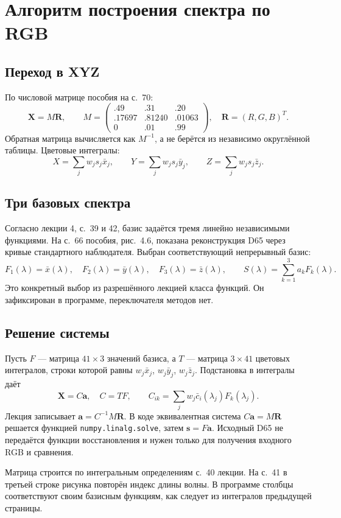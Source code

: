 \documentclass[a4paper,12pt]{article}
\newcommand{\code}[1]{\nolinkurl{#1}}
\begin{document}
\clearpage
\section{Алгоритм построения спектра по RGB}
\subsection{Переход в XYZ}
По числовой матрице пособия на с.~70:
\[
 \boldsymbol X=M\boldsymbol R,\qquad
 M=\begin{pmatrix}
 .49&.31&.20\\ .17697&.81240&.01063\\ 0&.01&.99
 \end{pmatrix},\quad \boldsymbol R=(R,G,B)^T.
\]
Обратная матрица вычисляется как $M^{-1}$, а не берётся из независимо округлённой таблицы. Цветовые интегралы:
\[
 X=\sum_jw_js_j\bar x_j,\qquad Y=\sum_jw_js_j\bar y_j,\qquad
 Z=\sum_jw_js_j\bar z_j.
\]

\subsection{Три базовых спектра}
Согласно лекции 4, с.~39 и 42, базис задаётся тремя линейно независимыми функциями. На с.~66 пособия, рис.~4.6, показана реконструкция D65 через кривые стандартного наблюдателя. Выбран соответствующий непрерывный базис:
\[
 F_1(\lambda)=\bar x(\lambda),\quad F_2(\lambda)=\bar y(\lambda),\quad
 F_3(\lambda)=\bar z(\lambda),\qquad S(\lambda)=\sum_{k=1}^3a_kF_k(\lambda).
\]
Это конкретный выбор из разрешённого лекцией класса функций. Он зафиксирован в программе, переключателя методов нет.

\subsection{Решение системы}
Пусть $F$ --- матрица $41\times3$ значений базиса, а $T$ --- матрица $3\times41$ цветовых интегралов, строки которой равны $w_j\bar x_j$, $w_j\bar y_j$, $w_j\bar z_j$. Подстановка в интегралы даёт
\[
 \boldsymbol X=C\boldsymbol a,\quad C=TF,\qquad
 C_{ik}=\sum_jw_j\bar c_i(\lambda_j)F_k(\lambda_j).
\]
Лекция записывает $\boldsymbol a=C^{-1}M\boldsymbol R$. В коде эквивалентная система $C\boldsymbol a=M\boldsymbol R$ решается функцией \code{numpy.linalg.solve}, затем $\boldsymbol s=F\boldsymbol a$. Исходный D65 не передаётся функции восстановления и нужен только для получения входного RGB и сравнения.

Матрица строится по интегральным определениям с.~40 лекции. На с.~41 в третьей строке рисунка повторён индекс длины волны. В программе столбцы соответствуют своим базисным функциям, как следует из интегралов предыдущей страницы.
\end{document}
